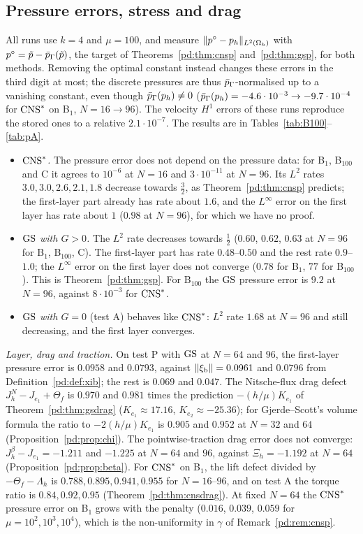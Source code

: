 \subsection{Pressure errors, stress and drag}\label{pd:sec:num}
All runs use $k=4$ and $\mu=100$, and measure $\lVert p^\circ-p_h\rVert_{L^2(\Omega_h)}$ with $p^\circ=\tilde p-\bar p_{\Gamma}(\tilde p)$, the target of Theorems~\ref{pd:thm:cnsp} and~\ref{pd:thm:gsp}, for both methods. Removing the optimal constant instead changes these errors in the third digit at most; the discrete pressures are thus $\bar p_{\Gamma}$-normalised up to a vanishing constant, even though $\bar p_{\Gamma}(p_h)\ne0$ ($\bar p_{\Gamma}(p_h)=-4.6\cdot10^{-3}\to-9.7\cdot10^{-4}$ for $\mathrm{CNS}^\ast$ on B$_1$, $N=16\to96$). The velocity $H^1$ errors of these runs reproduce the stored ones to a relative $2.1\cdot10^{-7}$. The results are in Tables~\ref{tab:B100}--\ref{tab:pA}.
\begin{itemize}
\item \emph{$\mathrm{CNS}^\ast$.} The pressure error does not depend on the pressure data: for B$_1$, B$_{100}$ and C it agrees to $10^{-6}$ at $N=16$ and $3\cdot10^{-11}$ at $N=96$. Its $L^2$ rates $3.0,3.0,2.6,2.1,1.8$ decrease towards $\frac32$, as Theorem~\ref{pd:thm:cnsp} predicts; the first-layer part already has rate about $1.6$, and the $L^\infty$ error on the first layer has rate about $1$ ($0.98$ at $N=96$), for which we have no proof.
\item \emph{$\mathrm{GS}$ with $G>0$.} The $L^2$ rate decreases towards $\frac12$ ($0.60$, $0.62$, $0.63$ at $N=96$ for B$_1$, B$_{100}$, C). The first-layer part has rate $0.48$--$0.50$ and the rest rate $0.9$--$1.0$; the $L^\infty$ error on the first layer does not converge ($0.78$ for B$_1$, $77$ for B$_{100}$). This is Theorem~\ref{pd:thm:gsp}. For B$_{100}$ the $\mathrm{GS}$ pressure error is $9.2$ at $N=96$, against $8\cdot10^{-3}$ for $\mathrm{CNS}^\ast$.
\item \emph{$\mathrm{GS}$ with $G=0$} (test A) behaves like $\mathrm{CNS}^\ast$: $L^2$ rate $1.68$ at $N=96$ and still decreasing, and the first layer converges.
\end{itemize}
\emph{Layer, drag and traction.} On test P with $\mathrm{GS}$ at $N=64$ and $96$, the first-layer pressure error is $0.0958$ and $0.0793$, against $\lVert \xi_{\mathrm b}\rVert=0.0961$ and $0.0796$ from Definition~\ref{pd:def:xib}; the rest is $0.069$ and $0.047$. The Nitsche-flux drag defect $J^N_h-J_{e_1}+\Theta_f$ is $0.970$ and $0.981$ times the prediction $-(h/\mu)K_{e_1}$ of Theorem~\ref{pd:thm:gsdrag} ($K_{e_1}\approx17.16$, $K_{e_2}\approx-25.36$); for Gjerde--Scott's volume formula the ratio to $-2(h/\mu)K_{e_1}$ is $0.905$ and $0.952$ at $N=32$ and $64$ (Proposition~\ref{pd:prop:chi}). The pointwise-traction drag error does not converge: $J^\beta_h-J_{e_1}=-1.211$ and $-1.225$ at $N=64$ and $96$, against $\Xi_h=-1.192$ at $N=64$ (Proposition~\ref{pd:prop:beta}). For $\mathrm{CNS}^\ast$ on B$_1$, the lift defect divided by $-\Theta_f-\Lambda_h$ is $0.788,0.895,0.941,0.955$ for $N=16$--$96$, and on test A the torque ratio is $0.84,0.92,0.95$ (Theorem~\ref{pd:thm:cnsdrag}). At fixed $N=64$ the $\mathrm{CNS}^\ast$ pressure error on B$_1$ grows with the penalty ($0.016$, $0.039$, $0.059$ for $\mu=10^2,10^3,10^4$), which is the non-uniformity in $\gamma$ of Remark~\ref{pd:rem:cnsp}.
